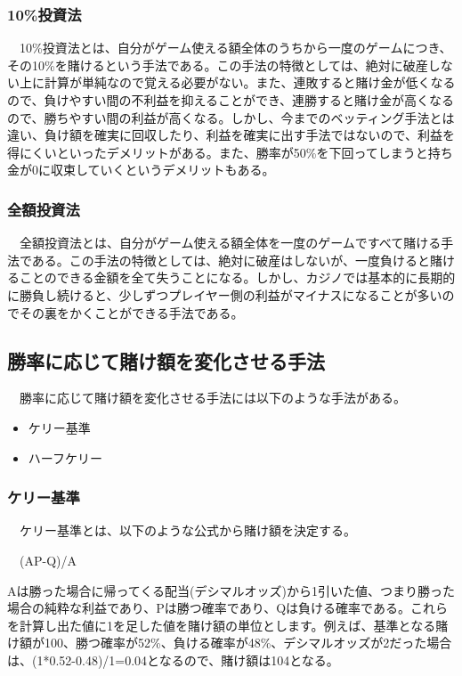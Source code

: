 \subsubsection{10\%投資法}  
　10\%投資法とは、自分がゲーム使える額全体のうちから一度のゲームにつき、その10\%を賭けるという手法である。この手法の特徴としては、絶対に破産しない上に計算が単純なので覚える必要がない。また、連敗すると賭け金が低くなるので、負けやすい間の不利益を抑えることができ、連勝すると賭け金が高くなるので、勝ちやすい間の利益が高くなる。しかし、今までのベッティング手法とは違い、負け額を確実に回収したり、利益を確実に出す手法ではないので、利益を得にくいといったデメリットがある。また、勝率が50\%を下回ってしまうと持ち金が0に収束していくというデメリットもある。
\subsubsection{全額投資法}  
　全額投資法とは、自分がゲーム使える額全体を一度のゲームですべて賭ける手法である。この手法の特徴としては、絶対に破産はしないが、一度負けると賭けることのできる金額を全て失うことになる。しかし、カジノでは基本的に長期的に勝負し続けると、少しずつプレイヤー側の利益がマイナスになることが多いのでその裏をかくことができる手法である。

\subsection{勝率に応じて賭け額を変化させる手法}
　勝率に応じて賭け額を変化させる手法には以下のような手法がある。
  \begin{itemize}
 \item ケリー基準
 \item ハーフケリー
 \end{itemize}
\subsubsection{ケリー基準}  
　ケリー基準とは、以下のような公式から賭け額を決定する。
\begin{center}　(AP-Q)/A　
\end{center}
Aは勝った場合に帰ってくる配当(デシマルオッズ)から1引いた値、つまり勝った場合の純粋な利益であり、Pは勝つ確率であり、Qは負ける確率である。これらを計算し出た値に1を足した値を賭け額の単位とします。例えば、基準となる賭け額が100、勝つ確率が52\%、負ける確率が48\%、デシマルオッズが2だった場合は、(1*0.52-0.48)/1=0.04となるので、賭け額は104となる。

